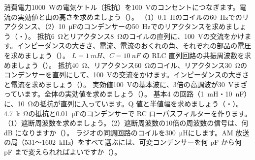 \bkendproblems
{}
\bkproblem 消費電力\qty{1000}{W}の電気ケトル（抵抗）を\qty{100}{V}のコンセントにつなぎます。電流の実効値と山の高さを求めましょう（\nobreak{}\nobreak）。
\bkproblem （1）\qty{0.1}{H}のコイルの\qty{60}{Hz}でのリアクタンス、（2）\qty{10}{\micro F}のコンデンサーの\qty{50}{Hz}でのリアクタンスを求めましょう（\nobreak{}・\nobreak）。
\bkproblem 抵抗\qty{6}{\ohm}とリアクタンス\qty{8}{\ohm}のコイルの直列に、\qty{100}{V}の交流をかけます。インピーダンスの大きさ、電流、電流のおくれの角、それぞれの部品の電圧を求めましょう（\nobreak{}\nobreak）。
\bkproblem $L=\qty{1}{mH}$、$C=\qty{10}{nF}$ の RLC 直列回路の共振周波数を求めましょう（\nobreak{}\nobreak）。
\bkproblem 抵抗\qty{40}{\ohm}、リアクタンス\qty{60}{\ohm}のコイル、リアクタンス\qty{30}{\ohm}のコンデンサーを直列にして、\qty{100}{V}の交流をかけます。インピーダンスの大きさと電流を求めましょう（\nobreak{}\nobreak）。
\bkproblem 実効値\qty{100}{V}の基本波に、3倍の高調波が\qty{30}{V}まざっています。全体の実効値を求めましょう（\nobreak{}\nobreak）。
\bkproblem 基本4 の回路（\qty{1}{mH}・\qty{10}{nF}）に、\qty{10}{\ohm}の抵抗が直列に入っています。Q 値と半値幅を求めましょう（\nobreak{}・\nobreak）。
\bkproblem \qty{4.7}{k\ohm}の抵抗と\qty{0.01}{\micro F}のコンデンサーで RC ローパスフィルターを作ります。（1）遮断周波数を求めましょう。（2）遮断周波数の10倍の周波数の信号は、何 dB になりますか（\nobreak{}\nobreak）。
\bkproblem ラジオの同調回路のコイルを\qty{300}{\micro H}にします。AM 放送の局（531〜\qty{1602}{kHz}）をすべて選ぶには、可変コンデンサーを何 pF から何 pF まで変えられればよいですか（\nobreak{}\nobreak）。
